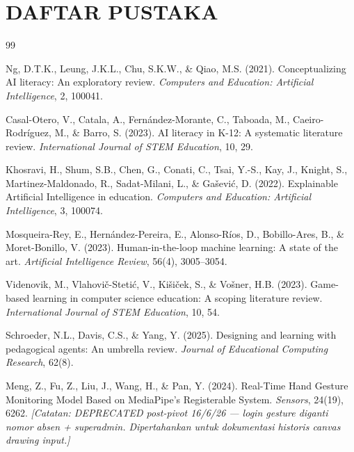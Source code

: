 \documentclass[12pt,a4paper,oneside,openany]{report}
\begin{document}
\chapter*{DAFTAR PUSTAKA}

\begin{thebibliography}{99}

Ng, D.T.K., Leung, J.K.L., Chu, S.K.W., \& Qiao, M.S. (2021). Conceptualizing AI literacy: An exploratory review. \textit{Computers and Education: Artificial Intelligence}, 2, 100041.

Casal-Otero, V., Catala, A., Fern\'andez-Morante, C., Taboada, M., Caeiro-Rodr\'iguez, M., \& Barro, S. (2023). AI literacy in K-12: A systematic literature review. \textit{International Journal of STEM Education}, 10, 29.

Khosravi, H., Shum, S.B., Chen, G., Conati, C., Tsai, Y.-S., Kay, J., Knight, S., Martinez-Maldonado, R., Sadat-Milani, L., \& Ga\v{s}evi\'c, D. (2022). Explainable Artificial Intelligence in education. \textit{Computers and Education: Artificial Intelligence}, 3, 100074.

Mosqueira-Rey, E., Hern\'andez-Pereira, E., Alonso-R\'ios, D., Bobillo-Ares, B., \& Moret-Bonillo, V. (2023). Human-in-the-loop machine learning: A state of the art. \textit{Artificial Intelligence Review}, 56(4), 3005--3054.

Videnovik, M., Vlahovi\v{c}-Steti\'c, V., Kišiček, S., \& Vošner, H.B. (2023). Game-based learning in computer science education: A scoping literature review. \textit{International Journal of STEM Education}, 10, 54.

Schroeder, N.L., Davis, C.S., \& Yang, Y. (2025). Designing and learning with pedagogical agents: An umbrella review. \textit{Journal of Educational Computing Research}, 62(8).

Meng, Z., Fu, Z., Liu, J., Wang, H., \& Pan, Y. (2024). Real-Time Hand Gesture Monitoring Model Based on MediaPipe's Registerable System. \textit{Sensors}, 24(19), 6262. \textit{[Catatan: DEPRECATED post-pivot 16/6/26 --- login gesture diganti nomor absen + superadmin. Dipertahankan untuk dokumentasi historis canvas drawing input.]}

\end{thebibliography}
\end{document}
